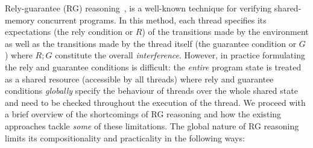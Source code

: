 Rely-guarantee (RG) reasoning~\cite{rg}, is a well-known technique for verifying shared-memory concurrent programs. In this method, each thread specifies its expectations (the rely condition or $R$) of the transitions made by the environment as well as the transitions made by the thread itself (the guarantee condition or $G$) where $R;G$ constitute the overall \emph{interference}. However, in practice formulating the rely and guarantee conditions is difficult: the \emph{entire} program state is treated as a shared resource (accessible by all threads) where rely and guarantee conditions \emph{globally} specify the behaviour of threads over the whole shared state and need to be checked throughout the execution of the thread. We proceed with a brief overview of the shortcomings of RG reasoning and how the existing approaches tackle \emph{some} of these limitations. 
%
The global nature of RG reasoning limits its compositionality and practicality in the following ways:
%

